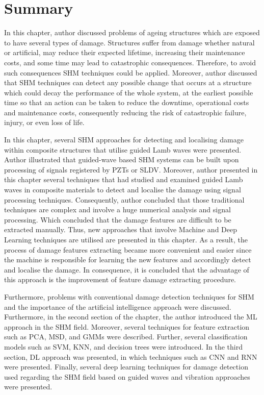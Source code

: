 \section{Summary}
\label{sec28}
In this chapter, author discussed problems of ageing structures which are exposed to have several types of damage. 
Structures suffer from damage whether natural or artificial, may reduce their expected lifetime, increasing their maintenance costs, and some time may lead to catastrophic consequences. 
Therefore, to avoid such consequences SHM techniques could be applied.  
Moreover, author discussed that SHM techniques can detect any possible change that occurs at a structure which could decay the performance of the whole system, at the earliest possible time so that an action can be taken to reduce the downtime,  operational costs and maintenance costs, consequently reducing the risk of catastrophic failure, injury, or even loss of life.

In this chapter,  several SHM approaches for detecting and localising damage within composite structures that utilise guided Lamb waves were presented. 
Author illustrated that guided-wave based SHM systems can be built upon processing of signals registered by PZTs or SLDV. 
Moreover, author presented in this chapter several techniques that had studied and examined guided Lamb waves in composite materials to detect and localise the damage using signal processing techniques. 
Consequently, author concluded that those traditional techniques are complex and involve a huge numerical analysis and signal processing. Which concluded that the damage features are difficult to be extracted manually. 
Thus, new approaches that involve Machine and Deep Learning techniques are utilised are presented in this chapter. 
As a result, the process of damage features extracting became more convenient and easier since the machine is responsible for learning the new features and accordingly  detect and localise the damage. 
In consequence, it is concluded that the advantage of this approach is the improvement of feature damage extracting procedure.

Furthermore, problems with conventional damage detection techniques for SHM and the importance of the artificial intelligence approach were discussed.
Furthermore, in the second section of the chapter, the author introduced the ML approach in the SHM field.
Moreover, several techniques for feature extraction such as PCA, MSD, and GMMs were described. 
Further, several classification models such as SVM, KNN, and decision trees were introduced.
In the third section, DL approach was presented, in which techniques such as CNN  and RNN were presented.
Finally, several deep learning techniques for damage detection used regarding the SHM field based on guided waves and vibration approaches were presented.%
